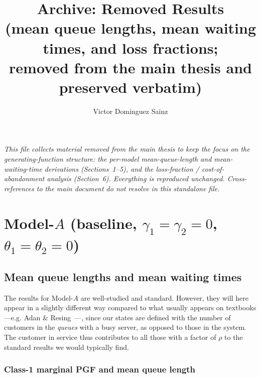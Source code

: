 \documentclass{article}
\title{Archive: Removed Results\\
\large (mean queue lengths, mean waiting times, and loss fractions;\\
removed from the main thesis and preserved verbatim)}
\author{Victor Dominguez Sainz}
\numberwithin{equation}{section}
\begin{document}
\maketitle
\tableofcontents

\bigskip
\noindent\emph{This file collects material removed from the main thesis to keep
the focus on the generating-function structure: the per-model mean-queue-length
and mean-waiting-time derivations (Sections~1--5), and the loss-fraction /
cost-of-abandonment analysis (Section~6). Everything is reproduced unchanged.
Cross-references to the main document do not resolve in this standalone file.}

\section{Model-$A$ (baseline, $\gamma_1=\gamma_2=0$, $\theta_1=\theta_2=0$)}

\subsection{Mean queue lengths and mean waiting times}

The results for Model-$A$ are well-studied and standard. However, they will here appear in a slightly different way compared to what usually appears on textbooks —e.g. Adan \& Resing~\cite{adan2002queueing}—, since our states are defined with the number of customers in the \emph{queues} with a busy server, as opposed to those in the system. The customer in service thus contributes to all those with a factor of $\rho$ to the standard results we would typically find. 

\subsubsection{Class-1 marginal PGF and mean queue length}
\end{document}
